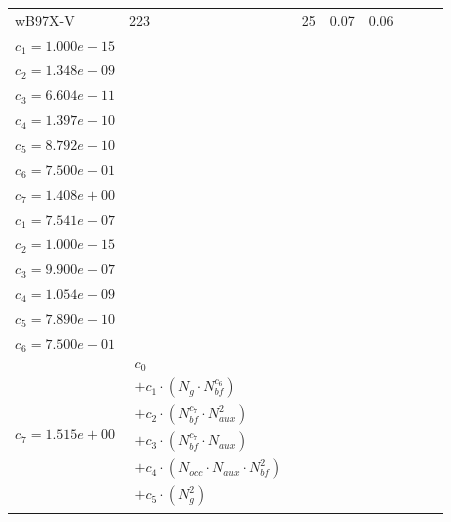 \begin{longtable}{|p{1.7cm}|p{1.2cm}|p{1.1cm}|p{1.4cm}|p{1.3cm}|p{3.0cm}|p{3.0cm}|p{4.8cm}|}
\hline
wB97X-V & 223 & 25 & 0.07 & 0.06 & \begin{tabular}{l}\(c_{0}=5.304e-10\) \\ \(c_{1}=1.000e-15\) \\ \(c_{2}=1.348e-09\) \\ \(c_{3}=6.604e-11\) \\ \(c_{4}=1.397e-10\) \\ \(c_{5}=8.792e-10\) \\ \(c_{6}=7.500e-01\) \\ \(c_{7}=1.408e+00\)\end{tabular} & \begin{tabular}{l}\(c_{0}=3.046e+03\) \\ \(c_{1}=7.541e-07\) \\ \(c_{2}=1.000e-15\) \\ \(c_{3}=9.900e-07\) \\ \(c_{4}=1.054e-09\) \\ \(c_{5}=7.890e-10\) \\ \(c_{6}=7.500e-01\) \\ \(c_{7}=1.515e+00\)\end{tabular} & $\begin{array}{l}c_{0} \\ + c_{1}  \cdot  (N_{g}  \cdot  N_{bf} ^{c_{6}}) \\ + c_{2}  \cdot  (N_{bf} ^{c_{7}}  \cdot  N_{aux}^{2}) \\ + c_{3}  \cdot  (N_{bf} ^{c_{7}}  \cdot  N_{aux}) \\ + c_{4}  \cdot  (N_{occ}  \cdot  N_{aux}  \cdot  N_{bf} ^{2}) \\ + c_{5}  \cdot  (N_{g} ^{2})\end{array}$ \\ 
\hline

\end{longtable}

